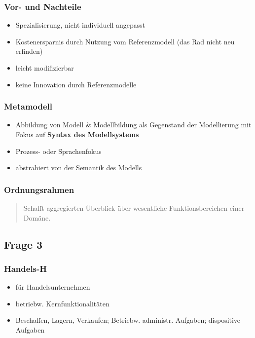 \documentclass[a4paper]{article}
\begin{document}
\subsubsection*{Vor- und Nachteile}
\begin{itemize}
	\item Spezialisierung, nicht individuell angepasst
	\item Kostenersparnis durch Nutzung vom Referenzmodell (das Rad nicht neu erfinden)
	\item leicht modifizierbar
	\item keine Innovation durch Referenzmodelle
\end{itemize}
\hrulefill

\subsubsection*{Metamodell}
\begin{itemize}
	\item Abbildung von Modell \& Modellbildung als Gegenstand der Modellierung mit Fokus auf \textbf{Syntax des Modellsystems}
	\item Prozess- oder Sprachenfokus
	\item abstrahiert von der Semantik des Modells
\end{itemize}

\subsubsection*{Ordnungsrahmen}
\begin{quote}
	Schafft aggregierten Überblick über wesentliche Funktionsbereichen einer Domäne.
\end{quote}

\pagebreak

\subsection*{Frage 3}
\label{le3-3}
\subsubsection*{Handels-H}
\begin{itemize}
	\item für Handelsunternehmen 
	\item betriebw. Kernfunktionalitäten 
	\item Beschaffen, Lagern, Verkaufen; Betriebw. administr. Aufgaben; dispositive Aufgaben
\end{itemize}
\end{document}
